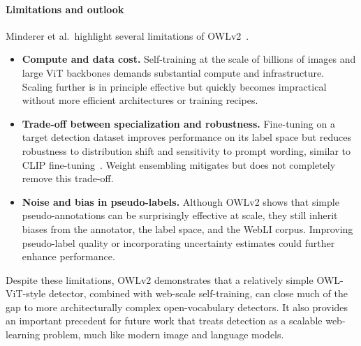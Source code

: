 \begin{enrichment}
\begin{enrichment}
		\paragraph{Limitations and outlook}
		Minderer et al.\ highlight several limitations of OWLv2~\cite{minderer2024_owlvitv2}.
		\begin{itemize}
			\item \textbf{Compute and data cost.} Self-training at the scale of billions of images and large ViT backbones demands substantial compute and infrastructure.
			Scaling further is in principle effective but quickly becomes impractical without more efficient architectures or training recipes.
			\item \textbf{Trade-off between specialization and robustness.} Fine-tuning on a target detection dataset improves performance on its label space but reduces robustness to distribution shift and sensitivity to prompt wording, similar to CLIP fine-tuning~\cite{wortsman2022_robustfinetuning}.
			Weight ensembling mitigates but does not completely remove this trade-off.
			\item \textbf{Noise and bias in pseudo-labels.} Although OWLv2 shows that simple pseudo-annotations can be surprisingly effective at scale, they still inherit biases from the annotator, the label space, and the WebLI corpus.
			Improving pseudo-label quality or incorporating uncertainty estimates could further enhance performance.
		\end{itemize}
		
		Despite these limitations, OWLv2 demonstrates that a relatively simple OWL-ViT-style detector, combined with web-scale self-training, can close much of the gap to more architecturally complex open-vocabulary detectors.
		It also provides an important precedent for future work that treats detection as a scalable web-learning problem, much like modern image and language models.
		
	\end{enrichment}
	
\end{enrichment}


